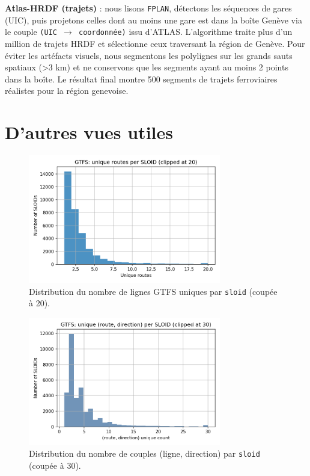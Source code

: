 \textbf{Atlas-HRDF (trajets)} : nous lisons \texttt{FPLAN}, détectons les séquences de gares (UIC), puis projetons celles dont au moins une gare est dans la boîte Genève via le couple \texttt{(UIC $\rightarrow$ coordonnée)} issu d'ATLAS. L'algorithme traite plus d'un million de trajets HRDF et sélectionne ceux traversant la région de Genève. Pour éviter les artéfacts visuels, nous segmentons les polylignes sur les grands sauts spatiaux (>3 km) et ne conservons que les segments ayant au moins 2 points dans la boîte. Le résultat final montre 500 segments de trajets ferroviaires réalistes pour la région genevoise.

\section{D'autres vues utiles}
\begin{figure}[H]
  \centering
  \includegraphics[width=0.75\textwidth]{../figures/chap4/hist_gtfs_routes_per_sloid.png}
  \caption{Distribution du nombre de lignes GTFS uniques par \texttt{sloid} (coupée à 20).}
\end{figure}

\begin{figure}[H]
  \centering
  \includegraphics[width=0.75\textwidth]{../figures/chap4/hist_gtfs_route_dir_per_sloid.png}
  \caption{Distribution du nombre de couples (ligne, direction) par \texttt{sloid} (coupée à 30).}
\end{figure}

